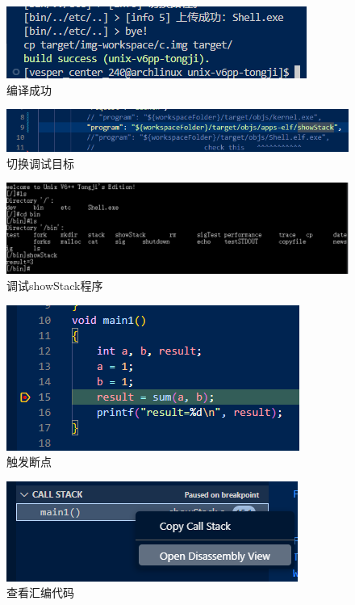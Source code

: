 \begin{figure}[!htbp]
    \centering
    \includegraphics[scale=1]{figures/buildSuccess.png}
    \caption{编译成功}\label{buildSuccess}
\end{figure}

\begin{figure}[!htbp]
    \centering
    \includegraphics[width=\textwidth]{figures/switch.png}
    \caption{切换调试目标}\label{switch}
\end{figure}

\begin{figure}[!htbp]
    \centering
    \includegraphics[width=\textwidth]{figures/showStack.png}
    \caption{调试showStack程序}\label{showStack}
\end{figure}

\begin{figure}[!htbp]
    \centering
    \includegraphics[scale=1]{figures/breakpoint.png}
    \caption{触发断点}\label{breakpoint}
\end{figure}

\begin{figure}[!htbp]
    \centering
    \includegraphics[scale=1]{figures/disassembly.png}
    \caption{查看汇编代码}\label{disassembly}
\end{figure}


